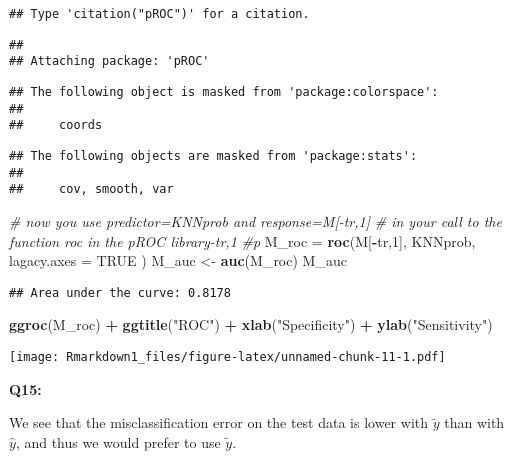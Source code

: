 \documentclass[]{article}
\newenvironment{Shaded}{\begin{snugshade}}{\end{snugshade}}
\newcommand{\KeywordTok}[1]{\textcolor[rgb]{0.13,0.29,0.53}{\textbf{#1}}}
\newcommand{\DataTypeTok}[1]{\textcolor[rgb]{0.13,0.29,0.53}{#1}}
\newcommand{\DecValTok}[1]{\textcolor[rgb]{0.00,0.00,0.81}{#1}}
\newcommand{\StringTok}[1]{\textcolor[rgb]{0.31,0.60,0.02}{#1}}
\newcommand{\CommentTok}[1]{\textcolor[rgb]{0.56,0.35,0.01}{\textit{#1}}}
\newcommand{\OtherTok}[1]{\textcolor[rgb]{0.56,0.35,0.01}{#1}}
\newcommand{\OperatorTok}[1]{\textcolor[rgb]{0.81,0.36,0.00}{\textbf{#1}}}
\newcommand{\NormalTok}[1]{#1}
\begin{document}
\begin{verbatim}
## Type 'citation("pROC")' for a citation.
\end{verbatim}

\begin{verbatim}
## 
## Attaching package: 'pROC'
\end{verbatim}

\begin{verbatim}
## The following object is masked from 'package:colorspace':
## 
##     coords
\end{verbatim}

\begin{verbatim}
## The following objects are masked from 'package:stats':
## 
##     cov, smooth, var
\end{verbatim}

\begin{Shaded}
\begin{Highlighting}[]
\CommentTok{# now you use predictor=KNNprob and response=M[-tr,1] }
\CommentTok{# in your call to the function roc in the pROC library-tr,1}
\CommentTok{#p}
\NormalTok{M_roc =}\StringTok{ }\KeywordTok{roc}\NormalTok{(M[}\OperatorTok{-}\NormalTok{tr,}\DecValTok{1}\NormalTok{], KNNprob, }\DataTypeTok{lagacy.axes =} \OtherTok{TRUE}\NormalTok{ )}
\NormalTok{M_auc <-}\StringTok{ }\KeywordTok{auc}\NormalTok{(M_roc)}
\NormalTok{M_auc}
\end{Highlighting}
\end{Shaded}

\begin{verbatim}
## Area under the curve: 0.8178
\end{verbatim}

\begin{Shaded}
\begin{Highlighting}[]
\KeywordTok{ggroc}\NormalTok{(M_roc) }\OperatorTok{+}\StringTok{ }\KeywordTok{ggtitle}\NormalTok{(}\StringTok{"ROC"}\NormalTok{) }\OperatorTok{+}\StringTok{ }\KeywordTok{xlab}\NormalTok{(}\StringTok{"Specificity"}\NormalTok{) }\OperatorTok{+}\StringTok{ }\KeywordTok{ylab}\NormalTok{(}\StringTok{"Sensitivity"}\NormalTok{)}
\end{Highlighting}
\end{Shaded}

\texttt{[image: Rmarkdown1\_files/figure-latex/unnamed-chunk-11-1.pdf]}

\textbf{Q15:}

We see that the misclassification error on the test data is lower with
\(\tilde{y}\) than with \(\hat{y}\), and thus we would prefer to use
\(\tilde{y}\).
\end{document}
